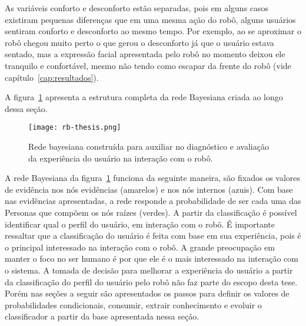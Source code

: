 As variáveis conforto e desconforto estão separadas, pois em alguns casos existiram pequenas diferenças que em uma mesma ação do robô, alguns usuários sentiram conforto e desconforto ao mesmo tempo. Por exemplo, ao se aproximar o robô chegou muito perto o que gerou o desconforto já que o usuário estava sentado, mas a expressão facial apresentada pelo robô no momento deixou ele tranquilo e confortável, mesmo não tendo como escapar da frente do robô (vide capítulo~\ref{cap:resultados}).

A figura~\ref{fig:rb} apresenta a estrutura completa da rede Bayesiana criada ao longo dessa seção.

\begin{figure}[ht!]
	\centering
	\begin{minipage}{\textwidth}
		\caption{Rede bayesiana construída para auxiliar no diagnóstico e avaliação da experiência do usuário na interação com o robô.}
		\texttt{[image: rb-thesis.png]}
		\label{fig:rb}
	\end{minipage}
\end{figure}

A rede Bayesiana da figura~\ref{fig:rb} funciona da seguinte maneira, são fixados os valores de evidência nos nós evidências (amarelos) e nos nós internos (azuis). Com base nas evidências apresentadas, a rede responde a probabilidade de ser cada uma das Personas que compõem os nós raízes (verdes). A partir da classificação é possível identificar qual o perfil do usuário, em interação com o robô. É importante ressaltar que a classificação do usuário é feita com base em sua experiência, pois é o principal interessado na interação com o robô. A grande preocupação em manter o foco no ser humano é por que ele é o mais interessado na interação com o sistema. A tomada de decisão para melhorar a experiência do usuário a partir da classificação do perfil do usuário pelo robô não faz parte do escopo desta tese. Porém nas seções a seguir são apresentados os passos para definir os valores de probabilidades condicionais, consumir, extrair conhecimento e evoluir o classificador a partir da base apresentada nessa seção.


